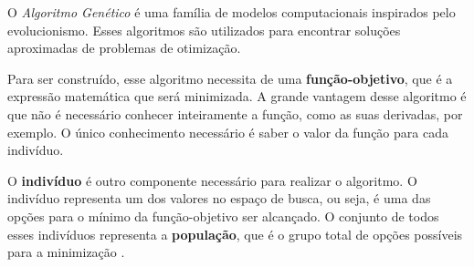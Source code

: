 O \textit{Algoritmo Genético} é uma família de modelos computacionais inspirados pelo evolucionismo. Esses algoritmos são utilizados para encontrar soluções aproximadas de problemas de otimização. 

Para ser construído, esse algoritmo necessita de uma \textbf{função-objetivo}, que é a expressão matemática que será minimizada. A grande vantagem desse algoritmo é que não é necessário conhecer inteiramente a função, como as suas derivadas, por exemplo. O único conhecimento necessário é saber o valor da função para cada indivíduo.

O \textbf{indivíduo} é outro componente necessário para realizar o algoritmo. O indivíduo representa um dos valores no espaço de busca, ou seja, é uma das opções para o mínimo da função-objetivo ser alcançado. O conjunto de todos esses indivíduos representa a \textbf{população}, que é o grupo total de opções possíveis para a minimização \cite{lindenalgoritmos}.

